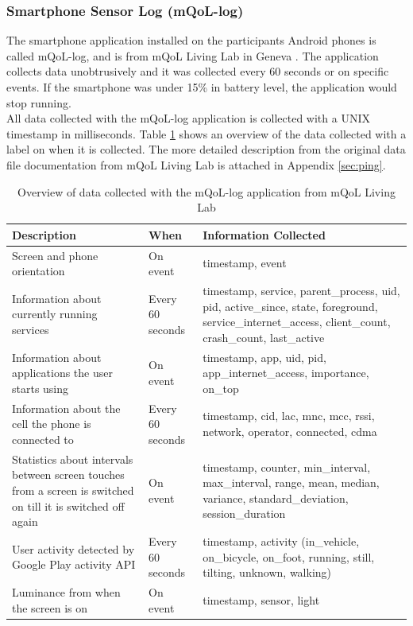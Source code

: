 \documentclass[12pt]{article} %
\begin{document}
\subsubsection{Smartphone Sensor Log (mQoL-log)}
The smartphone application installed on the participants Android phones is called mQoL-log, and is from mQoL Living Lab in Geneva \cite{mQOL}. The application collects data unobtrusively and it was collected every 60 seconds or on specific events. If the smartphone was under 15\% in battery level, the application would stop running. \\

All data collected with the mQoL-log application is collected with a UNIX timestamp in milliseconds. Table \ref{tab:ping} shows an overview of the data collected with a label on when it is collected. The more detailed description from the original data file documentation from mQoL Living Lab is attached in Appendix \ref{sec:ping}. 

\begin{table}[H]
\center
\begin{footnotesize}
	\begin{tabular}{| p{4cm} | p{2.7cm} | p{8.1cm} |}
	\hline
	\textbf{Description} & \textbf{When} & \textbf{Information Collected} \\
	\hline
	Screen and phone orientation & On event & timestamp, event \\
	\hline
	Information about currently running services & Every 60 seconds & timestamp, service, parent\_process, uid, pid, active\_since, state, foreground, service\_internet\_access, client\_count, crash\_count, last\_active\\
	\hline
	Information about applications the user starts using & On event & timestamp, app, uid, pid, app\_internet\_access, importance, on\_top\\
	\hline
	Information about the cell the phone is connected to & Every 60 seconds & timestamp, cid, lac, mnc, mcc, rssi, network, operator, connected, cdma\\
	\hline
	Statistics about intervals between screen touches from a screen is switched on till it is switched off again & On event & timestamp, counter, min\_interval, max\_interval, range, mean, median, variance, standard\_deviation, session\_duration \\
	\hline
	User activity detected by Google Play activity API & Every 60 seconds & timestamp, activity (in\_vehicle, on\_bicycle, on\_foot, running, still, tilting, unknown, walking) \\
	\hline
	Luminance from when the screen is on & On event & timestamp, sensor, light\\
	\hline	 
	\end{tabular}
	\caption{Overview of data collected with the mQoL-log application from mQoL Living Lab}
	\label{tab:ping}
\end{footnotesize}
\end{table}
\end{document}
